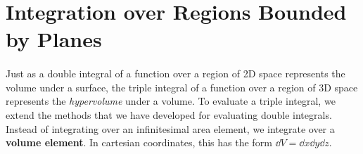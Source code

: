 \documentclass[../multivariate_calculus.tex]{subfiles}
\begin{document}
    \section{Integration over Regions Bounded by Planes}
        \paragraph{}
        Just as a double integral of a function over a region of 2D space represents the volume under a surface, the triple integral of a function over a region of 3D space represents the \textit{hypervolume} under a volume.
        To evaluate a triple integral, we extend the methods that we have developed for evaluating double integrals.
        Instead of integrating over an infinitesimal area element, we integrate over a \textbf{volume element}.
        In cartesian coordinates, this has the form $\dd{V}=\dd{x}\dd{y}\dd{z}$.
\end{document}
